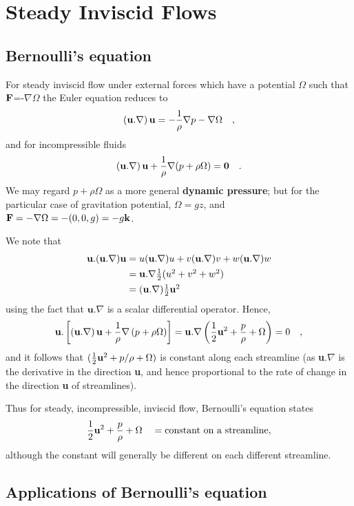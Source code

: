 \documentclass[twoside,a4paper,11pt]{report}
\begin{document}
\cleardoublepage


\chapter{Steady Inviscid Flows}

\section{Bernoulli's equation}
For steady inviscid flow under external forces which have a potential 
$\Omega $ such that ${{\bf F}}$=-$\nabla \Omega $ the Euler equation 
reduces to
\[
\left( {{{\bf u}}. \nabla } \right){{\bf 
u}}=-\frac{1}{\rho }\nabla p-\nabla \Omega \quad ,
\]
and for incompressible fluids
\[
\left( {{{\bf u}}. \nabla } \right){{\bf 
u}}+\frac{1}{\rho }\nabla (p+\rho \Omega )={{\bf 
0}}\quad .
\]
We may regard $p + \rho \Omega $ as a more general \textbf{dynamic 
pressure}; but for the particular case of gravitation potential, $\Omega  = 
gz$, and ${{\bf F}}=-\nabla \Omega 
=-(0,0,g)=-g{{\bf k}}$.

We note that
\begin{align*}
{{\bf u}}. ({{\bf u}}. \nabla ){{\bf 
u}} & =u({{\bf u}}. \nabla )u+v({{\bf 
u}}. \nabla )v+w({{\bf u}}. \nabla )w
\\\
&
={{\bf u}}. \nabla \textstyle{1 \over 
2}(u^2+v^2+w^2)
\\
&
=({{\bf u}}. \nabla )\textstyle{1 \over 2}{{\bf u}}^2
\end{align*}
using the fact that $\textbf{u}.  \nabla $ is a scalar differential 
operator. Hence,
\[
{{\bf u}}. \left[ {\left( {{{\bf u}}. \nabla } 
\right){{\bf u}}+\frac{1}{\rho }\nabla \left( {p+\rho 
\Omega } \right)} \right]={{\bf u}}. \nabla \left( 
{{1 \over 2}{{\bf u}}^2+\frac{p}{\rho }+\Omega 
} \right)=0\quad ,
\]
and it follows that $(\textstyle{1 \over 2}{{\bf u}}^2+p / 
\rho +\Omega )$ is constant along each streamline (as \textbf{u}$. 
\nabla $ is the derivative in the direction \textbf{u}, and hence 
proportional to the rate of change in the direction \textbf{u} of 
streamlines).

Thus for steady, incompressible, inviscid flow, Bernoulli's equation states
\[ {1 \over 2}{{\bf u}}^2+\frac{p}{\rho 
}+\Omega \quad = \hbox{constant on a streamline}, \]
although the constant will generally be different on each different 
streamline.

\section{Applications of Bernoulli's equation}
\end{document}

